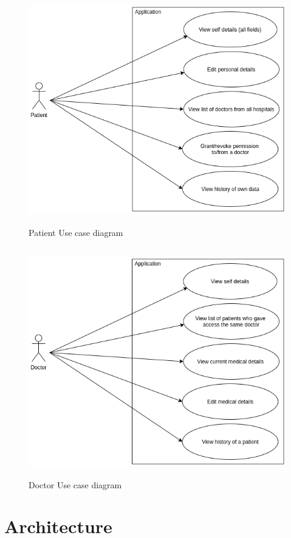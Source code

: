 \begin{figure}[htbp]
 \centering
 \includegraphics[width=1\textwidth, height=10cm]{gfx/figures/Patient use case.png}
 \caption{Patient Use case diagram}
 \label{fig:chapter03:patient use case}
\end{figure}

\begin{figure}[htbp]
 \centering
 \includegraphics[width=1\textwidth, height=10cm]{gfx/figures/Doctor use case.png}
 \caption{Doctor Use case diagram}
 \label{fig:chapter03:doctor use case}
\end{figure}



%
%
\section{Architecture}
\label{sec:implementation:architecture}

